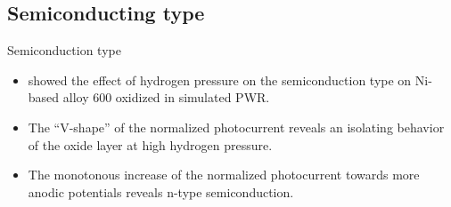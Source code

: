 \documentclass[10pt,compress]{beamer}
\begin{document}
\subsection{Semiconducting type}
    \begin{frame}[allowframebreaks=1.0]{Semiconduction type}
        \begin{itemize}
            \item \citet{loucif2013} showed the effect of hydrogen pressure on 
                  the semiconduction type on Ni-based alloy 600 oxidized in simulated PWR. 
            \item The “V-shape” of the normalized photocurrent 
                  reveals an isolating behavior of the oxide layer at high hydrogen pressure. 
            \item The monotonous increase of the 
                  normalized photocurrent towards more anodic potentials reveals 
                  n-type semiconduction.
        \end{itemize}


\end{frame}
\end{document}

